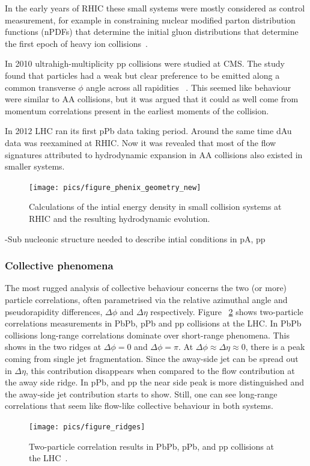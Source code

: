 In the early years of RHIC these small systems were mostly considered as control measurement, for example in constraining nuclear modified parton distribution functions (nPDFs) that determine the initial gluon distributions that determine the first epoch
of heavy ion collisions~\cite{Shen:2015qta, Adare:2015lcd}. 

In 2010 ultrahigh-multiplicity pp collisions were studied at CMS. The study found that particles had a weak but clear preference to be emitted along a common transverse $\phi$ angle across all rapidities ~\cite{Salgado:2016jws}. This seemed like behaviour were similar to AA collisions, but it was argued that it could as well come from momentum correlations present in the earliest moments of the collision.

In 2012 LHC ran its first pPb data taking period. Around the same time dAu data was reexamined at RHIC. Now it was revealed that most of the flow signatures attributed to hydrodynamic expansion in AA collisions also existed in smaller systems.
\begin{figure}[b!]
\centering
            	\texttt{[image: pics/figure\_phenix\_geometry\_new]}
                \caption{Calculations of the intial energy density in small collision systems at RHIC and the resulting hydrodynamic evolution.}
	\label{fig:smallsystems1}
\end{figure}



-Sub nucleonic structure needed to describe intial conditions in pA, pp
\subsubsection{Collective phenomena}
The most rugged analysis of collective behaviour concerns the two (or more) particle correlations, often parametrised via the relative azimuthal angle and pseudorapidity differences, $\Delta \phi$ and $\Delta \eta$ respectively. Figure ~\ref{fig:smallsystems2} shows two-particle correlations measurements in PbPb, pPb and pp collisions at the LHC. In PbPb collisions long-range correlations dominate over short-range phenomena. This shows in the two ridges at $\Delta \phi = 0 $ and $\Delta \phi = \pi$. At $\Delta\phi\approx\Delta\eta\approx0$, there is a peak coming from single jet fragmentation. Since the away-side jet can be spread out in $\Delta\eta$, this contribution disappears when compared to the flow contribution at the away side ridge. In pPb, and pp the near side peak is more distinguished and the away-side jet contribution starts to show. Still, one can see long-range correlations that seem like flow-like collective behaviour in both systems. 
\begin{figure}[b!]
\centering
            	\texttt{[image: pics/figure\_ridges]}
                \caption{Two-particle correlation results in PbPb, pPb, and pp collisions at the LHC~\cite{}. }
	\label{fig:smallsystems2}
\end{figure}

